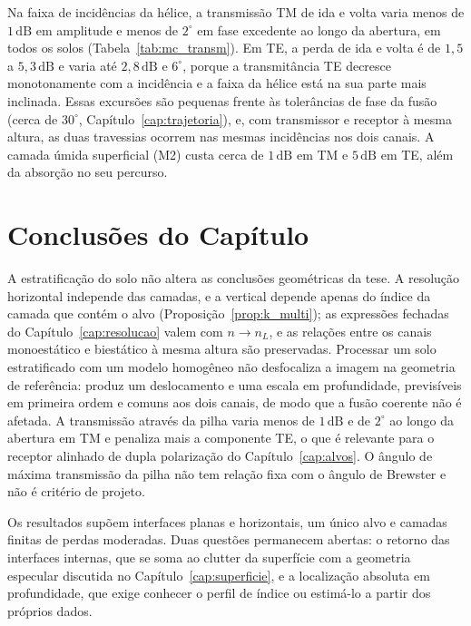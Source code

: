 \documentclass[12pt,a4paper,oneside]{book}
\theoremstyle{remark}
\newcommand{\dB}{\,\mathrm{dB}}
\theoremstyle{plain}
\theoremstyle{definition}
\begin{document}
Na faixa de incidências da hélice, a transmissão TM de ida e volta varia menos de
$1\dB$ em amplitude e menos de $2^\circ$ em fase excedente ao longo da abertura, em
todos os solos (Tabela~\ref{tab:mc_transm}). Em TE, a perda de ida e volta é de
$1,5$ a $5,3\dB$ e varia até $2,8\dB$ e $6^\circ$, porque a transmitância TE decresce
monotonamente com a incidência e a faixa da hélice está na sua parte mais inclinada. Essas excursões são pequenas frente às tolerâncias de
fase da fusão (cerca de $30^\circ$, Capítulo~\ref{cap:trajetoria}), e, com transmissor
e receptor à mesma altura, as duas travessias ocorrem nas mesmas incidências nos
dois canais. A camada úmida superficial (M2) custa cerca de $1\dB$ em TM e $5\dB$ em
TE, além da absorção no seu percurso.

\section{Conclusões do Capítulo}
\label{sec:multi_concl}

A estratificação do solo não altera as conclusões geométricas da tese. A
resolução horizontal independe das camadas, e a vertical depende apenas do índice
da camada que contém o alvo (Proposição~\ref{prop:k_multi}); as expressões fechadas
do Capítulo~\ref{cap:resolucao} valem com $n\to n_L$, e as relações entre os canais
monoestático e biestático à mesma altura são preservadas. Processar um solo
estratificado com um modelo homogêneo não desfocaliza a imagem na geometria de
referência: produz um deslocamento e uma escala em profundidade, previsíveis
em primeira ordem e comuns aos dois canais, de modo que a fusão coerente não é
afetada. A transmissão através da pilha varia menos de $1\dB$ e de $2^\circ$ ao longo
da abertura em TM e penaliza mais a componente TE, o que é relevante para o
receptor alinhado de dupla polarização do Capítulo~\ref{cap:alvos}. O ângulo de
máxima transmissão da pilha não tem relação fixa com o ângulo de Brewster e não é
critério de projeto.

Os resultados supõem interfaces planas e horizontais, um único alvo e camadas
finitas de perdas moderadas. Duas questões permanecem abertas: o retorno das
interfaces internas, que se soma ao clutter da superfície com a geometria
especular discutida no Capítulo~\ref{cap:superficie}, e a localização absoluta em
profundidade, que exige conhecer o perfil de índice ou estimá-lo a partir dos
próprios dados.

\end{document}
